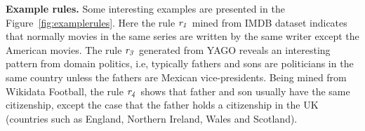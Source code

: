 \textbf{Example rules.} Some interesting examples are presented in the Figure~\ref{fig:examplerules}. Here 
the rule $\mathit{r_1}$ mined from IMDB dataset indicates that normally movies in the same series are written by the same writer except the American movies. The rule $\mathit{r_3}$ generated from YAGO reveals an interesting pattern from domain politics, i.e, typically fathers and sons are politicians in the same country unless the fathers are Mexican vice-presidents. Being mined from Wikidata Football, the rule $\mathit{r_4}$ shows that father and son usually have the same citizenship, except the case that the father holds a citizenship in the UK (countries such as England, Northern Ireland, Wales and Scotland).